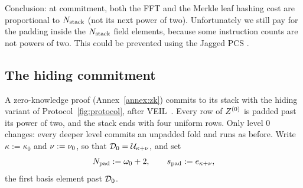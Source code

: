 Conclusion: at commitment, both the FFT and the Merkle leaf hashing cost are proportional to $N_{\mathrm{stack}}$ (not its next power of two). Unfortunately we still pay for the padding inside the $N_{\mathrm{stack}}$ field elements, because some instruction counts are not powers of two. This could be prevented using the Jagged PCS \cite{jagged_pcs}.


\subsection{The hiding commitment}\label{sec:pcs-zk}

A zero-knowledge proof (Annex~\ref{annex:zk}) commits to its stack with the hiding variant of Protocol~\ref{fig:protocol}, after VEIL~\cite{DHRR26}. Every row of $Z^{(0)}$ is padded past its power of two, and the stack ends with four uniform rows. Only level $0$ changes: every deeper level commits an unpadded fold and runs as before. Write $\kappa := \kappa_0$ and $\nu := \nu_0$, so that $\mathcal{D}_0 = \mathcal{U}_{\kappa + \nu}$, and set
\[
N_{\mathrm{pad}} := \omega_0 + 2, \qquad s_{\mathrm{pad}} := e_{\kappa + \nu},
\]
the first basis element past $\mathcal{D}_0$.

